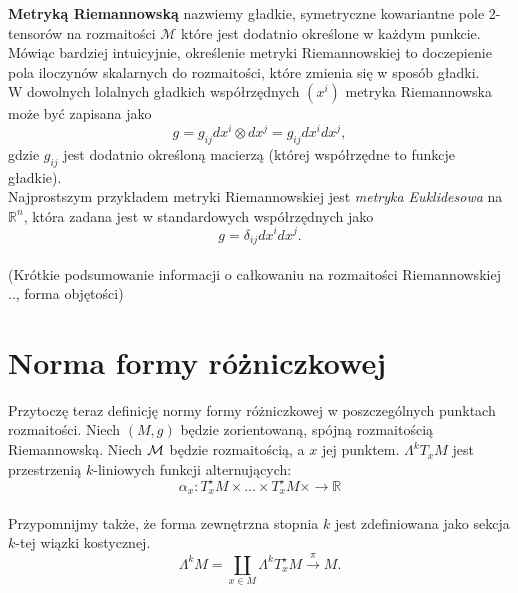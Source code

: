 \documentclass[licencjacka]{pracamgr}
\theoremstyle{definition}
\theoremstyle{definition}
\theoremstyle{plain}
\theoremstyle{plain}
\def\M{\ensuremath\mathcal{M}}
\begin{document}
\textbf{Metryką Riemannowską} nazwiemy gładkie, symetryczne kowariantne
pole 2-tensorów na rozmaitości
$\mathcal{M}$ które jest dodatnio określone w każdym punkcie. Mówiąc bardziej
intuicyjnie, określenie metryki Riemannowskiej to doczepienie 
pola iloczynów skalarnych do rozmaitości, które zmienia się w sposób gładki.
\\

W dowolnych lolalnych gładkich współrzędnych $(x^i)$ metryka Riemannowska
może być zapisana jako
\[
    g = g_{ij} dx^i \otimes dx^j = g_{ij} dx^i dx^j,
\]
gdzie
$g_{ij}$
jest dodatnio określoną macierzą (której współrzędne to funkcje gładkie). \\

Najprostszym przykładem metryki Riemannowskiej jest \emph{metryka Euklidesowa}
na $\mathbb{R}^n$, która zadana jest w standardowych współrzędnych jako
\[
    g = \delta_{ij}dx^idx^j.
\] \\


(Krótkie podsumowanie informacji o 
całkowaniu na rozmaitości Riemannowskiej .., forma objętości) \\



\section{Norma formy różniczkowej}

Przytoczę teraz definicję normy formy różniczkowej w poszczególnych punktach
rozmaitości. Niech $(M, g)$ będzie zorientowaną, spójną %
rozmaitością Riemannowską. Niech $\M$ będzie rozmaitością, a $x$ jej punktem.
$\Lambda^k T_x M$ jest przestrzenią $k$-liniowych funkcji alternujących:
\[
    \alpha_x:T_x^\star M \times ... \times T_x^\star M \times \rightarrow \mathbb{R}
\] \\

Przypomnijmy także, że forma zewnętrzna stopnia $k$ jest zdefiniowana jako 
sekcja $k$-tej wiązki kostycznej.
\[
    \Lambda^k M = \coprod_{x \in M} 
    \Lambda^k T_x^\star M \xrightarrow{\pi} M.
\] \\
\end{document}
